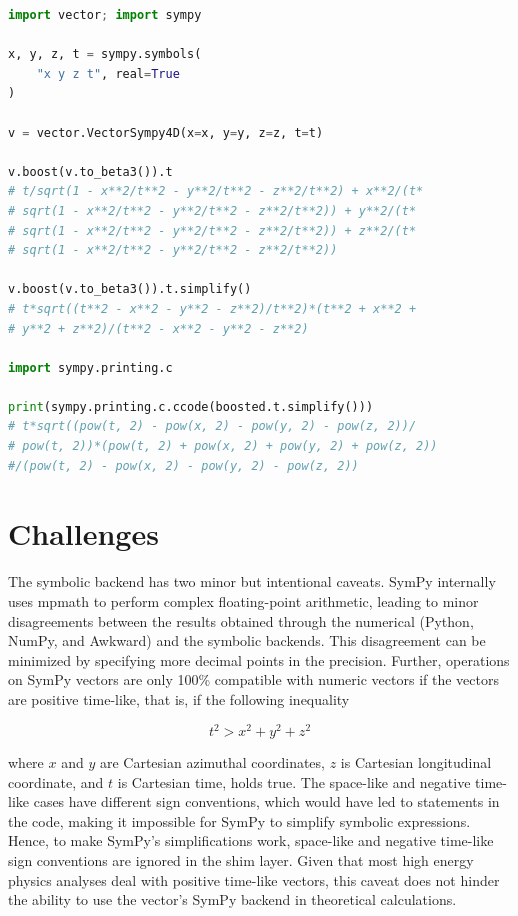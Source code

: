 \documentclass{webofc}
\begin{document}
\begin{lstlisting}[language=Python,mathescape=true,caption={Simplifying expressions and converting expressions into code for another programming language.},captionpos=b, label={vector-sympy-extra}]
import vector; import sympy

x, y, z, t = sympy.symbols(
    "x y z t", real=True
)

v = vector.VectorSympy4D(x=x, y=y, z=z, t=t)

v.boost(v.to_beta3()).t
# t/sqrt(1 - x**2/t**2 - y**2/t**2 - z**2/t**2) + x**2/(t*
# sqrt(1 - x**2/t**2 - y**2/t**2 - z**2/t**2)) + y**2/(t*
# sqrt(1 - x**2/t**2 - y**2/t**2 - z**2/t**2)) + z**2/(t*
# sqrt(1 - x**2/t**2 - y**2/t**2 - z**2/t**2))

v.boost(v.to_beta3()).t.simplify()
# t*sqrt((t**2 - x**2 - y**2 - z**2)/t**2)*(t**2 + x**2 +
# y**2 + z**2)/(t**2 - x**2 - y**2 - z**2)

import sympy.printing.c

print(sympy.printing.c.ccode(boosted.t.simplify()))
# t*sqrt((pow(t, 2) - pow(x, 2) - pow(y, 2) - pow(z, 2))/
# pow(t, 2))*(pow(t, 2) + pow(x, 2) + pow(y, 2) + pow(z, 2))
#/(pow(t, 2) - pow(x, 2) - pow(y, 2) - pow(z, 2))
\end{lstlisting}

\section{Challenges}
\label{sec-challenges}

The symbolic backend has two minor but intentional caveats. SymPy internally uses mpmath \cite{mpmath} to perform complex floating-point arithmetic, leading to minor disagreements between the results obtained through the numerical (Python, NumPy, and Awkward) and the symbolic backends. This disagreement can be minimized by specifying more decimal points in the precision. Further, operations on SymPy vectors are only 100\% compatible with numeric vectors if the vectors are positive time-like, that is, if the following inequality

\begin{equation} \label{ineq-positive-time}
t^{2} > x^{2} + y^{2} + z^{2}
\end{equation}

where $x$ and $y$ are Cartesian azimuthal coordinates, $z$ is Cartesian longitudinal coordinate, and $t$ is Cartesian time, holds true. The space-like and negative time-like cases have different sign conventions, which would have led to  statements in the code, making it impossible for SymPy to simplify symbolic expressions. Hence, to make SymPy's simplifications work, space-like and negative time-like sign conventions are ignored in the shim layer. Given that most high energy physics analyses deal with positive time-like vectors, this caveat does not hinder the ability to use the vector's SymPy backend in theoretical calculations.
\end{document}

